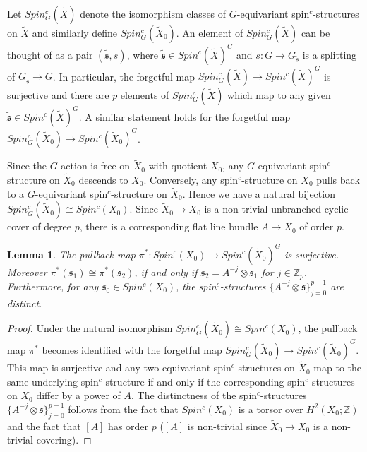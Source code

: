 \documentclass{amsart}
\newtheorem{lemma}[theorem]{Lemma}
\theoremstyle{definition}
\theoremstyle{remark}
\numberwithin{equation}{section}
\begin{document}
Let $Spin^c_G(\widetilde{X})$ denote the isomorphism classes of $G$-equivariant spin$^c$-structures on $\widetilde{X}$ and similarly define $Spin^c_G(\widetilde{X}_0)$. An element of $Spin^c_G(\widetilde{X})$ can be thought of as a pair $(\widetilde{\mathfrak{s}} , s)$, where $\widetilde{\mathfrak{s}} \in Spin^c(\widetilde{X})^G$ and $s : G \to G_{\widetilde{\mathfrak{s}}}$ is a splitting of $G_{\widetilde{\mathfrak{s}}} \to G$. In particular, the forgetful map $Spin^c_G(\widetilde{X}) \to Spin^c(\widetilde{X})^G$ is surjective and there are $p$ elements of $Spin^c_G(\widetilde{X})$ which map to any given $\widetilde{\mathfrak{s}} \in Spin^c(\widetilde{X})^G$. A similar statement holds for the forgetful map $Spin^c_G(\widetilde{X}_0) \to Spin^c(\widetilde{X}_0)^G$.

Since the $G$-action is free on $\widetilde{X}_0$ with quotient $X_0$, any $G$-equivariant spin$^c$-structure on $\widetilde{X}_0$ descends to $X_0$. Conversely, any spin$^c$-structure on $X_0$ pulls back to a $G$-equivariant spin$^c$-structure on $\widetilde{X}_0$. Hence we have a natural bijection $Spin^c_G(\widetilde{X}_0) \cong Spin^c(X_0)$. Since $\widetilde{X}_0 \to X_0$ is a non-trivial unbranched cyclic cover of degree $p$, there is a corresponding flat line bundle $A \to X_0$ of order $p$.

\begin{lemma}
The pullback map $\pi^* : Spin^c(X_0) \to Spin^c(\widetilde{X}_0)^G$ is surjective. Moreover $\pi^*(\mathfrak{s}_1) \cong \pi^*(\mathfrak{s}_2)$, if and only if $\mathfrak{s}_2 = A^{-j} \otimes \mathfrak{s}_1$ for $j \in \mathbb{Z}_p$. Furthermore, for any $\mathfrak{s}_0 \in Spin^c(X_0)$, the spin$^c$-structures $\{ A^{-j} \otimes \mathfrak{s} \}_{j=0}^{p-1}$ are distinct.
\end{lemma}
\begin{proof}
Under the natural isomorphism $Spin^c_G(\widetilde{X}_0) \cong Spin^c(X_0)$, the pullback map $\pi^*$ becomes identified with the forgetful map $Spin^c_G(\widetilde{X}_0) \to Spin^c(\widetilde{X}_0)^G$. This map is surjective and any two equivariant spin$^c$-structures on $\widetilde{X}_0$ map to the same underlying spin$^c$-structure if and only if the corresponding spin$^c$-structures on $X_0$ differ by a power of $A$. The distinctness of the spin$^c$-structures $\{ A^{-j} \otimes \mathfrak{s} \}_{j=0}^{p-1}$ follows from the fact that $Spin^c(X_0)$ is a torsor over $H^2(X_0 ; \mathbb{Z})$ and the fact that $[A]$ has order $p$ ($[A]$ is non-trivial since $\widetilde{X}_0 \to X_0$ is a non-trivial covering).
\end{proof}
\end{document}
